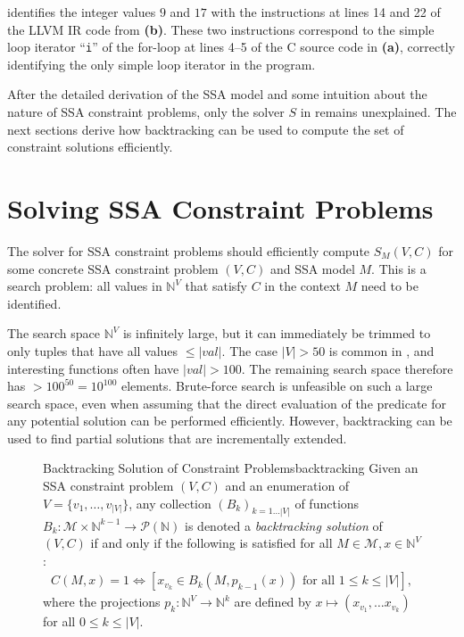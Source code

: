      identifies the integer values $9$ and $17$ with the
    instructions at lines 14 and 22 of the LLVM IR code from
     {\bf(b)}.
    These two instructions correspond to the simple loop iterator ``{\tt i}''
    of the for-loop at lines 4--5 of the C source code in
     {\bf(a)}, correctly identifying the only simple loop
    iterator in the program.

    After the detailed derivation of the SSA model and some intuition about the
    nature of SSA constraint problems, only the solver $S$ in
     remains unexplained.
    The next sections derive how backtracking can be used to
    compute the set of constraint solutions efficiently.

\section{Solving SSA Constraint Problems}
\label{sec:constraintsolving}

    The solver for SSA constraint problems should efficiently compute $S_M(V,C)$
    for some concrete SSA constraint problem $(V,C)$ and SSA model $M$.
    This is a search problem:
    all values in $\mathbb N^V$ that satisfy $C$ in the context $M$ need to be
    identified.

    The search space $\mathbb N^V$ is infinitely large, but it can immediately
    be trimmed to only tuples that have all values $\leq|val|$.
    The case \mbox{$|V|>50$} is common in
    , and interesting
    functions often have \mbox{$|val|>100$}.
    The remaining search space therefore has $>100^{50}=10^{100}$ elements.
    Brute-force search is unfeasible on such a large search space, even when
    assuming that the direct evaluation of the predicate for any potential
    solution can be performed efficiently.
    However, backtracking can be used to find partial solutions that are
    incrementally extended.

\begin{figure}[h]
    \begin{definition}{Backtracking Solution of Constraint Problems}{backtracking}
        Given an SSA constraint problem $(V,C)$ and an enumeration of
        $V=\{v_1,\dots,v_{|V|}\}$, any collection $(B_k)_{k=1\dots |V|}$
        of functions
        $B_k:\mathcal M\times \mathbb N^{k-1}\rightarrow\mathcal P(\mathbb N)$
        is denoted a {\em backtracking solution} of $(V,C)$ if and only if the
        following is satisfied for all $M\in\mathcal M,x\in\mathbb N^V$:
        \begin{align}
            C(M,x)=1\iff\left[x_{v_k}\in B_k(M,p_{k-1}(x))\text{ for all }1\leq k\leq |V|\right],
        \end{align}
        where the projections $p_k\colon\mathbb N^V\rightarrow\mathbb N^k$ are
        defined by $x\mapsto(x_{v_1},\dots x_{v_k})$ for all $0\leq k\leq |V|$.
    \end{definition}
\end{figure}

